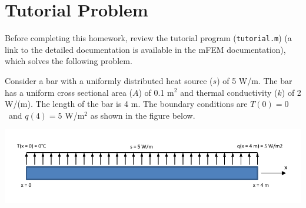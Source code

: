 \section*{Tutorial Problem}
Before completing this homework, review the tutorial program (\texttt{tutorial.m}) (a link to the detailed documentation is available in the mFEM documentation), which solves the following problem.

Consider a bar with a uniformly distributed heat source ($s$) of 5 W/m. The bar has a uniform cross sectional area ($A$) of 0.1 m$^2$ and thermal conductivity ($k$) of 2 W/(\C m). The length of the bar is 4 m. The boundary conditions are $T(0) = 0$ \C ~and $q(4) = 5$ W/m$^2$ as shown in the figure below. 

\begin{center}
\includegraphics{HW2/tutorial.pdf}
\end{center}






